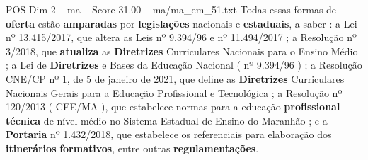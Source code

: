 \begin{textsample}{POS Dim 2 – ma – Score 31.00 – ma/ma\_em\_51.txt}
Todas essas formas de \textbf{oferta} estão \textbf{amparadas} por \textbf{legislações} nacionais e \textbf{estaduais}, a saber : a Lei nº 13.415/2017, que altera as Leis nº 9.394/96 e nº 11.494/2017 ; a Resolução nº 3/2018, que \textbf{atualiza} as \textbf{Diretrizes} Curriculares Nacionais para o Ensino Médio ; a Lei de \textbf{Diretrizes} e Bases da Educação Nacional ( nº 9.394/96 ) ; a Resolução CNE/CP nº 1, de 5 de janeiro de 2021, que define as \textbf{Diretrizes} Curriculares Nacionais Gerais para a Educação Profissional e Tecnológica ; a Resolução nº 120/2013 ( CEE/MA ), que estabelece normas para a educação \textbf{profissional} \textbf{técnica} de nível médio no Sistema Estadual de Ensino do Maranhão ; e a \textbf{Portaria} nº 1.432/2018, que estabelece os referenciais para elaboração dos \textbf{itinerários} \textbf{formativos}, entre outras \textbf{regulamentações}.

\end{textsample}
